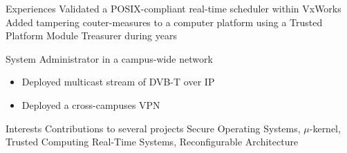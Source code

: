 \begin{resume}
\begin{supitemize}{Experiences}
		{Validated a POSIX-compliant real-time scheduler within VxWorks}
		{Added tampering couter-measures to a computer platform using a Trusted Platform Module}
		{Treasurer during years }
		{
			System Administrator in a campus-wide network
			\begin{itemize}
				\item Deployed multicast stream of DVB-T over IP
				\item Deployed a cross-campuses VPN
			\end{itemize}
		}
\end{supitemize}

\begin{supitemize}{Interests}
		{Contributions to several projects}
		{Secure Operating Systems, \ensuremath{\mu}-kernel, Trusted Computing}
		{Real-Time Systems, Reconfigurable Architecture}
\end{supitemize}

\end{resume}
